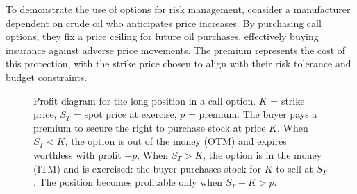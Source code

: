 \documentclass[english,12pt,a4paper,pdftex,sci,utf8]{aaltothesis}
\begin{document}
To demonstrate the use of options for risk management, consider a manufacturer dependent on crude oil who anticipates price increases. By purchasing call options, they fix a price ceiling for future oil purchases, effectively buying insurance against adverse price movements. The premium represents the cost of this protection, with the strike price chosen to align with their risk tolerance and budget constraints.

\begin{center}
\begin{figure}[H]
\centering

    \caption{Profit diagram for the long position in a call option. $K$ = strike price, $S_T$ = spot price at exercise, $p$ = premium. The buyer pays a premium to secure the right to purchase stock at price $K$. When $S_T < K$, the option is out of the money (OTM) and expires worthless with profit $-p$. When $S_T > K$, the option is in the money (ITM) and is exercised: the buyer purchases stock for $K$ to sell at $S_T$. The position becomes profitable only when $S_T - K > p$.}

    \label{fig:long_call_payoff}
\end{figure}
\end{center}
\end{document}
